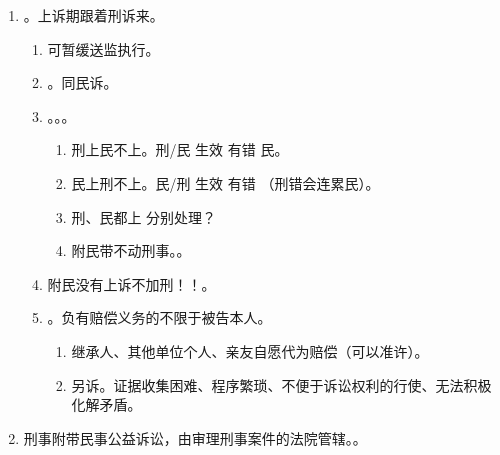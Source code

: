 \begin{enumerate}
\begin{enumerate}
          \item {}。上诉期跟着刑诉来。
                \begin{enumerate}
                  \item 可暂缓送监执行。
                  \item {}。同民诉。
                  \item {}。。。
                        \begin{enumerate}
                          \item 刑上民不上。刑\sjt/民 \yjt 生效 \yjt 有错 \yjt 民。
                          \item 民上刑不上。民\sjt/刑 \yjt 生效 \yjt 有错 \yjt {}（刑错会连累民）。
                          \item 刑、民都上 \yjt 分别处理？
                          \item 附民带不动刑事。。
                        \end{enumerate}
                  \item 附民没有上诉不加刑！！。
                  \item {}。负有赔偿义务的不限于被告本人。
                        \begin{enumerate}
                          \item 继承人、其他单位个人、亲友自愿代为赔偿（可以准许）。
                          \item 另诉。证据收集困难、程序繁琐、不便于诉讼权利的行使、无法积极化解矛盾。
                        \end{enumerate}
                \end{enumerate}
          \item 刑事附带民事公益诉讼，由审理刑事案件的法院管辖。。
        \end{enumerate}
\end{enumerate}
